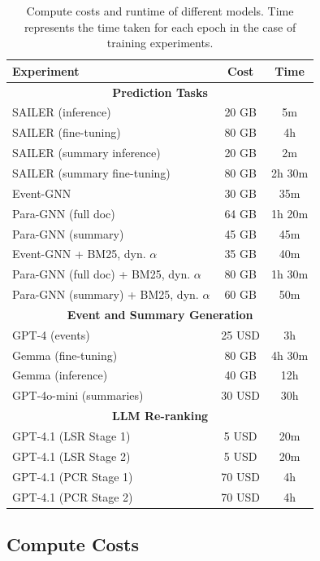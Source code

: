 \begin{table}
    \centering
    \small
    \setlength{\tabcolsep}{5pt}
    \begin{tabular}{lcc}
    \toprule
        \textbf{Experiment} & \textbf{Cost} & \textbf{Time} \\
        \midrule
        \multicolumn{3}{c}{\textbf{Prediction Tasks}}\\ \midrule
        
        SAILER (inference) & 20 GB & 5m \\
        SAILER (fine-tuning) & 80 GB & 4h \\
        SAILER (summary inference) & 20 GB & 2m \\
        SAILER (summary fine-tuning) & 80 GB & 2h 30m \\
        Event-GNN & 30 GB & 35m \\
        Para-GNN (full doc)& 64 GB & 1h 20m \\
        Para-GNN (summary) & 45 GB & 45m\\
 Event-GNN + BM25, dyn. $\alpha$& 35 GB&40m\\
 Para-GNN (full doc) + BM25, dyn. $\alpha$& 80 GB&1h 30m\\
 Para-GNN (summary) + BM25, dyn. $\alpha$ & 60 GB&50m\\ \midrule
        \multicolumn{3}{c}{\textbf{Event and Summary Generation}}\\ \midrule 
        GPT-4 (events) & 25 USD & 3h\\
        Gemma (fine-tuning) & 80 GB & 4h 30m \\
        Gemma (inference) & 40 GB & 12h \\
        GPT-4o-mini (summaries) & 30 USD& 30h\\ \midrule
 \multicolumn{3}{c}{\textbf{LLM Re-ranking}}\\ \midrule
 GPT-4.1 (LSR Stage 1)& 5 USD&20m\\
 GPT-4.1 (LSR Stage 2)& 5 USD&20m\\
 GPT-4.1 (PCR Stage 1)& 70 USD&4h\\
 GPT-4.1 (PCR Stage 2)& 70 USD&4h\\ \bottomrule
    \end{tabular}
    \caption{Compute costs and runtime of different models. Time represents the time taken for each epoch in the case of training experiments.}
    \label{tab:computecosts}
\end{table}

\subsection{Compute Costs}~\label{app:expt/costs}

